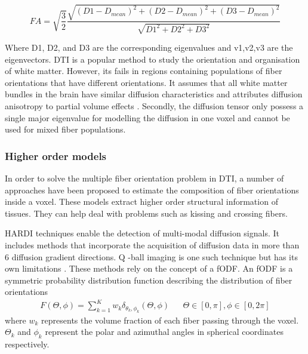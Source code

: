 \documentclass[msthesis.tex]{subfiles}
\begin{document}
\begin{equation}
\label{eq:meanFA}
FA = \sqrt{\frac{3}{2}} \frac{\sqrt{(D1 -D_{mean})^2+(D2 -D_{mean})^2 + (D3 -D_{mean})^2
}}{\sqrt{D1^2 + D2^2 + D3^2}}
\end{equation}

Where D1, D2, and D3 are the corresponding eigenvalues and v1,v2,v3 are the eigenvectors.
\gls{DTI} is a popular method to study the orientation and organisation of white matter.  However, its fails in regions containing populations of fiber orientations that have different orientations. It assumes that all white matter bundles in the brain have similar diffusion characteristics and attributes diffusion anisotropy to partial volume effects \cite{tournier2004direct}. Secondly, the diffusion tensor only possess a single major eigenvalue for modelling the diffusion in one voxel and cannot be used for mixed fiber populations.
\subsubsection{Higher order models}
\label{sec:highermodels}

In order to solve the multiple fiber orientation problem in \gls{DTI}, a number of approaches have been proposed to estimate the composition of fiber orientations inside a voxel. These models extract higher order structural information of tissues. They can help deal with problems such as kissing and crossing fibers. 

\gls{HARDI} techniques enable the detection of multi-modal diffusion signals. It includes methods that incorporate the acquisition of diffusion data in more than 6 diffusion gradient directions. Q -ball imaging is one such technique but has its own limitations \cite{TOURNIER20041176}. These methods rely on the concept of a \gls{fODF}. An \gls{fODF} is a symmetric probability distribution function describing the distribution of fiber orientations
\begin{align}
  F(\Theta, \phi) = \sum_{k=1}^{K} w_k \delta_{\theta_k, \phi_k}(\Theta, \phi) &
 & \Theta \in [0, \pi], \phi \in [0,2\pi]
\end{align}
where $w_k$ represents the volume fraction of each fiber passing through the voxel. $\Theta_k$ and $\phi_k$ represent the polar and azimuthal angles in spherical coordinates respectively.
\end{document}
